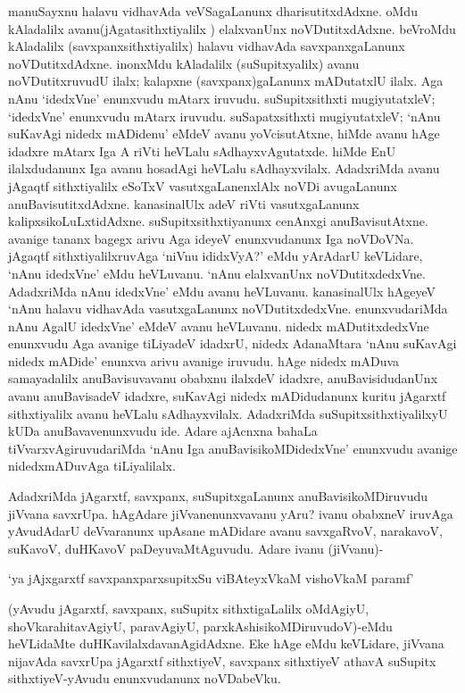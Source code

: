 manuSayxnu halavu vidhavAda veVSagaLanunx dharisutitxdAdxne. oMdu kAladalilx avanu(jAgatasithxtiyalilx ) elalxvanUnx noVDutitxdAdxne. beVroMdu kAladalilx (savxpanxsithxtiyalilx) halavu vidhavAda savxpanxgaLanunx noVDutitxdAdxne. inonxMdu kAladalilx (suSupitxyalilx) avanu noVDutitxruvudU ilalx; kalapxne (savxpanx)gaLanunx mADutatxlU ilalx. Aga nAnu `idedxVne' enunxvudu mAtarx iruvudu. suSupitxsithxti mugiyutatxleV; `idedxVne' enunxvudu mAtarx iruvudu. suSapatxsithxti mugiyutatxleV; `nAnu suKavAgi nidedx mADidenu' eMdeV avanu yoVcisutAtxne, hiMde avanu hAge idadxre mAtarx Iga A riVti heVLalu sAdhayxvAgutatxde. hiMde EnU ilalxdudanunx Iga avanu hosadAgi heVLalu sAdhayxvilalx. AdadxriMda avanu jAgaqtf sithxtiyalilx eSoTxV vasutxgaLanenxlAlx noVDi avugaLanunx anuBavisutitxdAdxne. kanasinalUlx adeV riVti vasutxgaLanunx kalipxsikoLuLxtidAdxne. suSupitxsithxtiyanunx cenAnxgi anuBavisutAtxne. avanige tananx bagegx arivu Aga ideyeV enunxvudanunx Iga noVDoVNa. jAgaqtf sithxtiyalilxruvAga `niVnu ididxVyA?' eMdu yArAdarU keVLidare, `nAnu idedxVne' eMdu heVLuvanu. `nAnu elalxvanUnx noVDutitxdedxVne. AdadxriMda nAnu idedxVne' eMdu avanu heVLuvanu. kanasinalUlx hAgeyeV `nAnu halavu vidhavAda vasutxgaLanunx noVDutitxdedxVne. enunxvudariMda nAnu AgalU idedxVne' eMdeV avanu heVLuvanu. nidedx mADutitxdedxVne enunxvudu Aga avanige tiLiyadeV idadxrU, nidedx AdanaMtara `nAnu suKavAgi nidedx mADide' enunxva arivu avanige iruvudu. hAge nidedx mADuva samayadalilx anuBavisuvavanu obabxnu ilalxdeV idadxre, anuBavisidudanUnx avanu anuBavisadeV idadxre, suKavAgi nidedx mADidudanunx kuritu jAgarxtf sithxtiyalilx avanu heVLalu sAdhayxvilalx. AdadxriMda suSupitxsithxtiyalilxyU kUDa anuBavavenunxvudu ide. Adare ajAcnxna bahaLa tiVvarxvAgiruvudariMda `nAnu Iga anuBavisikoMDidedxVne' enunxvudu avanige nidedxmADuvAga tiLiyalilalx.

AdadxriMda jAgarxtf, savxpanx, suSupitxgaLanunx anuBavisikoMDiruvudu jiVvana savxrUpa. hAgAdare jiVvanenunxvavanu yAru? ivanu obabxneV iruvAga yAvudAdarU deVvaranunx upAsane mADidare avanu savxgaRvoV, narakavoV, suKavoV, duHKavoV paDeyuvaMtAguvudu. Adare ivanu (jiVvanu)-

\begin{shloka}
`ya jAjxgarxtf savxpanxparxsupitxSu viBAteyxVkaM vishoVkaM paramf'
\end{shloka}

(yAvudu jAgarxtf, savxpanx, suSupitx sithxtigaLalilx oMdAgiyU, shoVkarahitavAgiyU, paravAgiyU, parxkAshisikoMDiruvudoV)-eMdu heVLidaMte duHKavilalxdavanAgidAdxne. Eke hAge eMdu keVLidare, jiVvana nijavAda savxrUpa jAgarxtf sithxtiyeV, savxpanx sithxtiyeV athavA suSupitx sithxtiyeV-yAvudu enunxvudanunx noVDabeVku.

